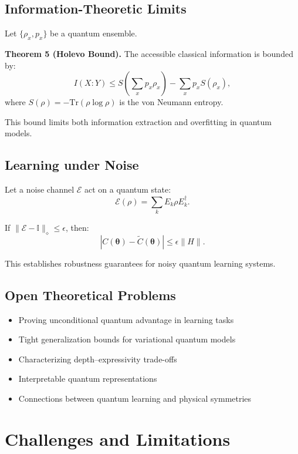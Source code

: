 \documentclass[11pt,a4paper]{article}
\begin{document}
\subsection{Information-Theoretic Limits}

Let $\{\rho_x, p_x\}$ be a quantum ensemble.

\textbf{Theorem 5 (Holevo Bound).}
The accessible classical information is bounded by:
\[
I(X:Y) \leq
S\left(\sum_x p_x \rho_x\right)
-
\sum_x p_x S(\rho_x),
\]
where $S(\rho) = -\text{Tr}(\rho \log \rho)$ is the von Neumann entropy.

This bound limits both information extraction and overfitting in quantum models.

\subsection{Learning under Noise}

Let a noise channel $\mathcal{E}$ act on a quantum state:
\[
\mathcal{E}(\rho) = \sum_k E_k \rho E_k^\dagger.
\]

If $\|\mathcal{E} - \mathbb{I}\|_\diamond \leq \epsilon$, then:
\[
|C(\boldsymbol{\theta}) - \tilde{C}(\boldsymbol{\theta})|
\leq \epsilon \|H\|.
\]

This establishes robustness guarantees for noisy quantum learning systems.

\subsection{Open Theoretical Problems}

\begin{itemize}
\item Proving unconditional quantum advantage in learning tasks
\item Tight generalization bounds for variational quantum models
\item Characterizing depth--expressivity trade-offs
\item Interpretable quantum representations
\item Connections between quantum learning and physical symmetries
\end{itemize}
\newpage

\section{Challenges and Limitations}
\end{document}
